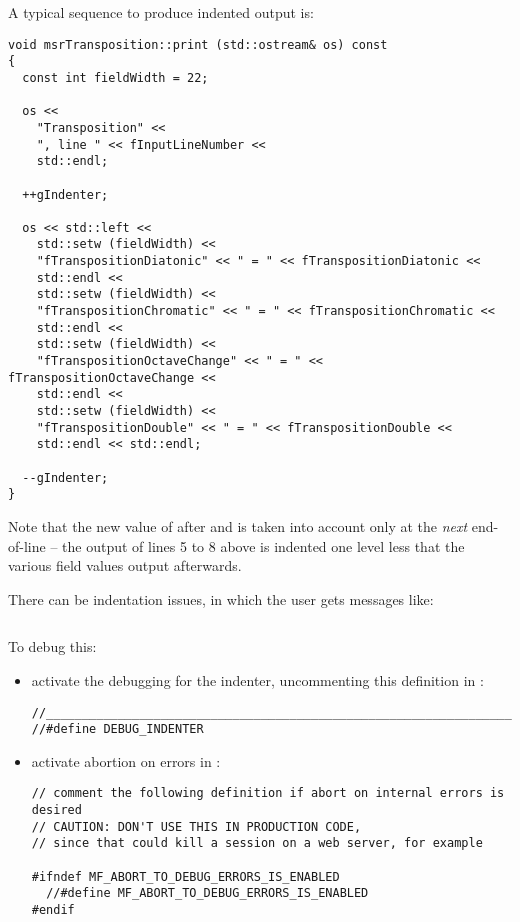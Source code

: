 A typical sequence to produce indented output is:
\begin{lstlisting}[language=CPlusPlus]
void msrTransposition::print (std::ostream& os) const
{
  const int fieldWidth = 22;

  os <<
    "Transposition" <<
    ", line " << fInputLineNumber <<
    std::endl;

  ++gIndenter;

  os << std::left <<
    std::setw (fieldWidth) <<
    "fTranspositionDiatonic" << " = " << fTranspositionDiatonic <<
    std::endl <<
    std::setw (fieldWidth) <<
    "fTranspositionChromatic" << " = " << fTranspositionChromatic <<
    std::endl <<
    std::setw (fieldWidth) <<
    "fTranspositionOctaveChange" << " = " << fTranspositionOctaveChange <<
    std::endl <<
    std::setw (fieldWidth) <<
    "fTranspositionDouble" << " = " << fTranspositionDouble <<
    std::endl << std::endl;

  --gIndenter;
}
\end{lstlisting}

Note that the new value of  after  and  is taken into account only at the {\it next} end-of-line -- the output of lines 5 to 8 above is indented one level less that the various field values output afterwards.

There can be indentation issues, in which the user gets messages like:
\begin{lstlisting}[language=Terminal]
% ### Indentation has become negative: -1
\end{lstlisting}

To debug this:
\begin{itemize}
\item activate the debugging for the indenter, uncommenting this definition in :
\begin{lstlisting}[language=CPlusplus]
//______________________________________________________________________________
//#define DEBUG_INDENTER
\end{lstlisting}

\item activate abortion on errors in :
\begin{lstlisting}[language=CPlusPlus]
// comment the following definition if abort on internal errors is desired
// CAUTION: DON'T USE THIS IN PRODUCTION CODE,
// since that could kill a session on a web server, for example

#ifndef MF_ABORT_TO_DEBUG_ERRORS_IS_ENABLED
  //#define MF_ABORT_TO_DEBUG_ERRORS_IS_ENABLED
#endif
\end{lstlisting}


\end{itemize}


